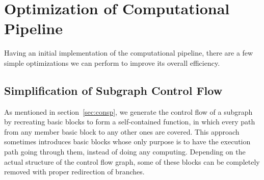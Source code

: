 
\section{Optimization of Computational Pipeline}
Having an initial implementation of the computational pipeline, there are a few simple
optimizations we can perform to improve its overall efficiency. 

\subsection{Simplification of Subgraph Control Flow}
\label{sscf}
As mentioned in section~\ref{sec:consp}, we generate the control flow of a subgraph by
recreating basic blocks to form a self-contained function, in which every path from
any member basic block to any other ones are covered. This approach sometimes introduces 
basic blocks whose only purpose is to have the execution path going through them, instead
of doing any computing. Depending on the actual structure of the control flow graph, some
of these blocks can be completely removed with proper redirection of branches. 


